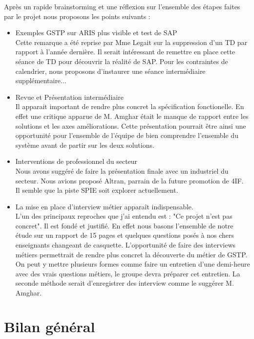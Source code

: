 Après un rapide brainstorming et une réflexion sur l'ensemble des étapes faites 
par le projet nous proposons les points suivants : 

\begin{itemize}
\item Exemples GSTP sur ARIS plus visible et test de SAP\\ 
Cette remarque a été reprise par Mme Legait sur la suppression d'un TD par rapport à 
l'année dernière. Il serait intéressant de remettre en place cette séance de TD 
pour découvrir la réalité de SAP. Pour les contraintes de calendrier, nous 
proposons d'instaurer une séance intermédiaire supplémentaire...
\item Revue et Présentation intermédiaire \\
Il apparait important de rendre plus concret la spécification fonctionelle. 
En effet une critique apparue de M. Amghar était le manque de rapport entre 
les solutions et les axes améliorations. Cette présentation pourrait être ainsi 
une opportunité pour l'ensemble de l'équipe de bien comprendre l'ensemble du système
 avant de partir sur les deux solutions.
\item Interventions de professionnel du secteur\\
Nous avons suggéré de faire la présentation finale avec un industriel du secteur. 
Nous avions proposé Altran, parrain de la future promotion de 4IF. 
Il semble que la piste SPIE soit explorer actuellement.
\item La mise en place d'interview métier apparaît indispensable. \\
L'un des principaux reproches que j'ai entendu est : "Ce projet n'est pas concret". 
Il est fondé et justifié. En effet nous basons l'ensemble de notre étude sur un 
rapport de 15 pages et quelques questions posés à nos chers enseignants 
changeant de casquette. L'opportunité de faire des interviews métiers 
permettrait de rendre plus concret la découverte du métier de GSTP. \\
On peut y mettre plusieurs formes comme faire un entretien d'une demi-heure avec 
des vrais questions métiers, le groupe devra préparer cet entretien. La seconde
méthode serait d'enregistrer des interview comme le suggérer M. Amghar.
\end{itemize}

\section{Bilan général}

